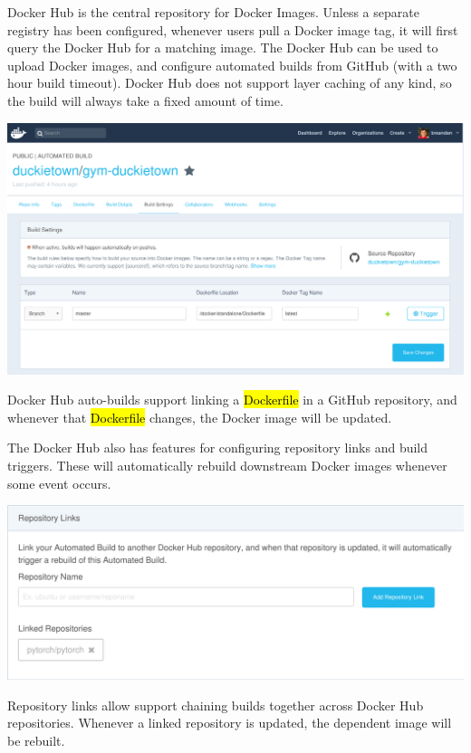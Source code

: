 \documentclass[12pt,initial,twoside,maitrise]{dms}
\newcommand{\inline}[1]{%
    \begingroup%
    \sethlcolor{slightgray}%
    \hl{\ttfamily\small #1}%
    \endgroup
}
\numberwithin{equation}{section}
\numberwithin{table}{chapter}
\numberwithin{figure}{chapter}
\begin{document}
Docker Hub is the central repository for Docker Images. Unless a separate registry has been configured, whenever users pull a Docker image tag, it will first query the Docker Hub for a matching image. The Docker Hub can be used to upload Docker images, and configure automated builds from GitHub (with a two hour build timeout). Docker Hub does not support layer caching of any kind, so the build will always take a fixed amount of time.\vspace{10pt}
%
\begin{centering}
\includegraphics[width=\textwidth]{../figures/docker_hub_autobuild.png}
\end{centering}
%
Docker Hub auto-builds support linking a \inline{Dockerfile} in a GitHub repository, and whenever that \inline{Dockerfile} changes, the Docker image will be updated.

The Docker Hub also has features for configuring repository links and build triggers. These will automatically rebuild downstream Docker images whenever some event occurs.\vspace{10pt}
%
\begin{centering}
\includegraphics[width=\textwidth]{../figures/docker_hub_repo_links.png}
\end{centering}
%
Repository links allow support chaining builds together across Docker Hub repositories. Whenever a linked repository is updated, the dependent image will be rebuilt.
\end{document}
